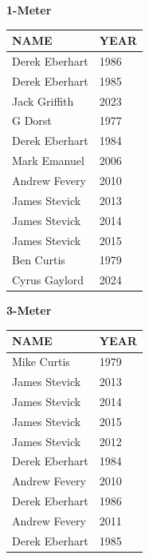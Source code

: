 \begin{table}[H]
\centering
\begin{minipage}[t]{0.6\textwidth}
\centering
\textbf{1-Meter}\\[0.1cm]
\begin{tabular}{@{}p{2.8cm}p{1.2cm}@{}}
\hline
    \textbf{NAME} & \textbf{YEAR} \\
\hline
    Derek Eberhart & 1986 \\
    Derek Eberhart & 1985 \\
    Jack Griffith & 2023 \\
    G Dorst & 1977 \\
    Derek Eberhart & 1984 \\
    Mark Emanuel & 2006 \\
    Andrew Fevery & 2010 \\
    James Stevick & 2013 \\
    James Stevick & 2014 \\
    James Stevick & 2015 \\
    Ben Curtis & 1979 \\
    Cyrus Gaylord & 2024 \\
\hline
\end{tabular}
\end{minipage}
\end{table}

\begin{table}[H]
\centering
\begin{minipage}[t]{0.6\textwidth}
\centering
\textbf{3-Meter}\\[0.1cm]
\begin{tabular}{@{}p{2.8cm}p{1.2cm}@{}}
\hline
    \textbf{NAME} & \textbf{YEAR} \\
\hline
    Mike Curtis & 1979 \\
    James Stevick & 2013 \\
    James Stevick & 2014 \\
    James Stevick & 2015 \\
    James Stevick & 2012 \\
    Derek Eberhart & 1984 \\
    Andrew Fevery & 2010 \\
    Derek Eberhart & 1986 \\
    Andrew Fevery & 2011 \\
    Derek Eberhart & 1985 \\
\hline
\end{tabular}
\end{minipage}
\end{table}

